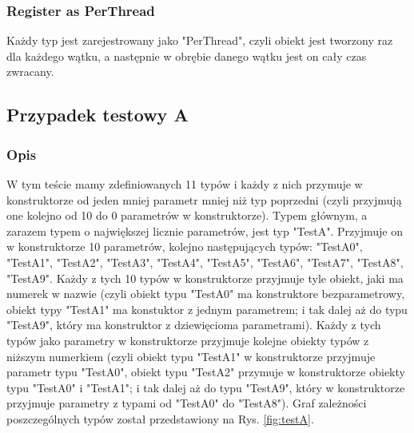 \documentclass[12pt]{article}
\begin{document}
\subsubsection{Register as PerThread}
Każdy typ jest zarejestrowany jako "PerThread", czyli obiekt jest tworzony raz dla każdego wątku, a następnie w obrębie danego wątku jest on cały czas zwracany.

\subsection{Przypadek testowy A}
\subsubsection{Opis}
W tym teście mamy zdefiniowanych 11 typów i każdy z nich przymuje w konstruktorze od jeden mniej parametr mniej niż typ poprzedni (czyli przyjmują one kolejno od 10 do 0 parametrów w konstruktorze). Typem głównym, a zarazem typem o największej licznie parametrów, jest typ "TestA". Przyjmuje on w konstruktorze 10 parametrów, kolejno następujących typów: "TestA0", "TestA1", "TestA2", "TestA3", "TestA4", "TestA5", "TestA6", "TestA7", "TestA8", "TestA9". Każdy z tych 10 typów w konstruktorze przyjmuje tyle obiekt, jaki ma numerek w nazwie (czyli obiekt typu "TestA0" ma konstruktore bezparametrowy, obiekt typy "TestA1" ma konstuktor z jednym parametrem; i tak dalej aż do typu "TestA9", który ma konstruktor z dziewięcioma parametrami). Każdy z tych typów jako parametry w konstruktorze przyjmuje kolejne obiekty typów z niższym numerkiem (czyli obiekt typu "TestA1" w konstruktorze przyjmuje parametr typu "TestA0", obiekt typu "TestA2" przymuje w konstruktorze obiekty typu "TestA0" i "TestA1";  i tak dalej aż do typu "TestA9", który w konstruktorze przyjmuje parametry z typami od "TestA0" do "TestA8"). Graf zależności poszczególnych typów został przedstawiony na Rys. \ref{fig:testA}.\\
\end{document}
